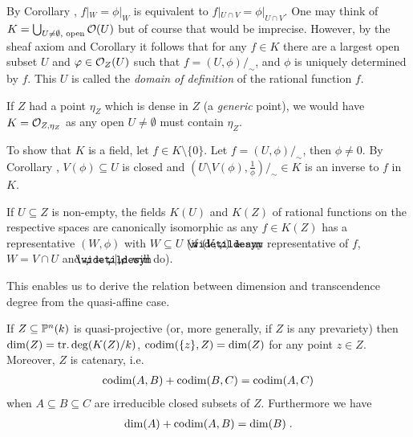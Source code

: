 \documentclass[a4paper,parskip=half,numbers=enddot, DIV=12, headheight=30pt]{scrreprt}
\begin{document}
\begin{rem*}
    \begin{alphanumerate}
        \item 
            By Corollary , $f|_W = \phi|_W$ is equivalent to $f|_{U\cap V} = \phi|_{U\cap V}$. One may think of $K=\bigcup_{U\neq\emptyset,\text{ open}} \mathcal{O}(U)$ but of course that would be imprecise. However, by the sheaf axiom and Corollary  it follows that for any $f\in K$ there are a largest open subset $U$ and $\varphi \in \mathcal{O}_Z(U)$ such that $f=(U,\phi)/_\sim$, and $\phi$ is uniquely determined by $f$. This $U$ is called the \emph{domain of definition} of the rational function $f$.
        \item 
            If $Z$ had a point $\eta_Z$ which is dense in $Z$ (a \emph{generic} point), we would have $K = \mathcal{O}_{Z,\eta_Z}$ as any open $U\neq \emptyset$ must contain $\eta_Z$.
        \item
            To show that $K$ is a field, let $f\in K\setminus \{0\}$. Let $f=(U,\phi)/_\sim$, then $\phi\neq 0$. By Corollary , $V(\phi)\subseteq U$ is closed and $\left(U\setminus V(\phi), \frac{1}{\phi}\right)/_\sim \in K$ is an inverse to $f$ in $K$.
        \item 
            If $U\subseteq Z$ is non-empty, the fields $K(U)$ and $K(Z)$ of rational functions on the respective spaces are canonically isomorphic as any $f\in K(Z)$ has a representative $(W,\phi)$ with $W\subseteq U$ (if $(V,\snake\phi)$ is any representative of $f$, $W=V\cap U$ and $\phi=\snake \phi|_W$ will do).
    \end{alphanumerate}
\end{rem*}
This enables us to derive the relation between dimension and transcendence degree from the quasi-affine case.
\begin{prop}
    If $Z\subseteq \mathbb{P}^n(k)$ is quasi-projective (or, more generally, if $Z$ is any prevariety) then $\dim(Z) = \operatorname{tr.deg}(K(Z)/k)$, $\operatorname{codim}(\{z\},Z) = \dim(Z)$ for any point $z\in Z$. Moreover, $Z$ is catenary, i.e.
    \begin{align*}
        \operatorname{codim}(A,B) +\operatorname{codim}(B,C) = \operatorname{codim}(A,C)
    \end{align*}
    when $A\subseteq B\subseteq C$ are irreducible closed subsets of $Z$. Furthermore we have
    \begin{align*}
        \dim(A) +\operatorname{codim}(A,B) = \dim(B)\;.
    \end{align*}
\end{prop}
\end{document}
